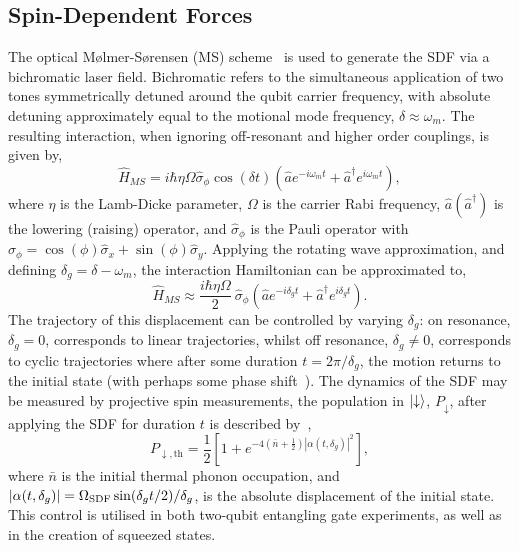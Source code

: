 \subsection{Spin-Dependent Forces}
\label{sec:Spin-Dependent Forces}
    The optical Mølmer-Sørensen (MS) scheme~\cite{sorensen2000entanglement} is used to generate the
    SDF via a bichromatic laser field. Bichromatic refers to the simultaneous
    application of two tones symmetrically detuned around the qubit carrier
    frequency, with absolute detuning approximately equal to the motional mode
    frequency, $\delta \approx \omega_{m}$. The resulting interaction, when
    ignoring off-resonant and higher order couplings, is given by,
    \begin{equation}
        \hat{H}_{MS} = i\hbar \eta\Omega\hat{\sigma}_\phi\cos(\delta t) \left( \hat{a} e^{-i\omega_{m} t} + \hat{a}^\dagger e^{i\omega_{m} t} \right),
    \end{equation}
    where $\eta$ is the Lamb-Dicke parameter, $\Omega$ is the carrier Rabi
    frequency, $\hat{a}(\hat{a}^\dagger)$ is the lowering (raising) operator, and
    $\hat{\sigma}_\phi$ is the Pauli operator with $\hat{\sigma}_\phi = \cos(\phi)\hat{\sigma}_x + \sin(\phi)\hat{\sigma}_y$.
    Applying the rotating wave approximation, and defining $\delta_g = \delta -
    \omega_{m}$, the interaction Hamiltonian can be approximated
    to,
    \begin{equation}
        \label{eqn:MS}
        \hat{H}_{MS} \approx \frac{i\hbar \eta\Omega}{2}~\hat{\sigma}_\phi \left( \hat{a} e^{-i\delta_g t} + \hat{a}^\dagger e^{i\delta_g t} \right).
    \end{equation}
    The trajectory of this displacement can be controlled by varying $\delta_g$: on
    resonance, $\delta_g = 0$, corresponds to linear trajectories, whilst off resonance,
    $\delta_g \neq 0$, corresponds to cyclic trajectories where after some duration $t =
    2\pi/\delta_g$, the motion returns to the initial state (with perhaps some phase shift~\cite{haljan2005spin-dependent}). 
    The dynamics of the SDF may be measured by projective spin measurements, the population in $\ket{\downarrow}$, $P_\downarrow$, after applying the SDF for duration $t$ is described by~\cite{burd2020squeezing},
    \begin{equation}
        \label{eqn:sdf_pop}
        P_{\downarrow,\mathrm{th}} = \frac{1}{2} \left[ 1 + e^{-4\left( \bar{n} + \frac{1}{2} \right) |\alpha(t, \delta_g)|^2} \right],
    \end{equation}
    where $\bar{n}$ is the initial thermal phonon occupation, and $|\alpha(t, \delta_g)| = \Omega_{\rm SDF} \sin(\delta_g t/2)/\delta_g$, is the absolute displacement of the initial state.
    This control is utilised in both two-qubit entangling gate experiments, as well as
    in the creation of squeezed states.\\


